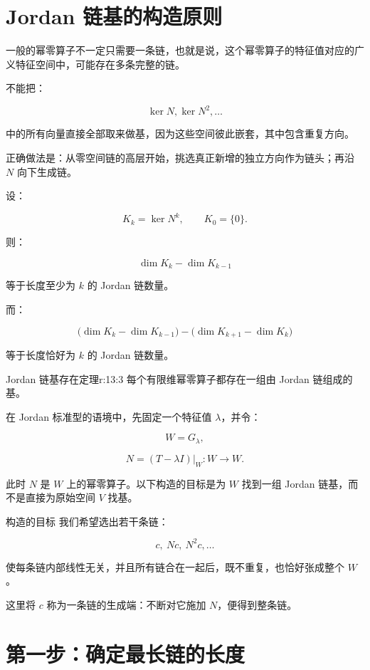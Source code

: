 \section{Jordan 链基的构造原则}

一般的幂零算子不一定只需要一条链，也就是说，这个幂零算子的特征值对应的广义特征空间中，可能存在多条完整的链。

不能把：

\[
\ker N,\ker N^2,\ldots
\]

中的所有向量直接全部取来做基，因为这些空间彼此嵌套，其中包含重复方向。

正确做法是：从零空间链的高层开始，挑选真正新增的独立方向作为链头；再沿 $N$ 向下生成链。

设：

\[
K_k=\ker N^k,
\qquad
K_0=\{0\}.
\]

则：

\[
\dim K_k-\dim K_{k-1}
\]

等于长度至少为 $k$ 的 Jordan 链数量。

而：

\[
\bigl(\dim K_k-\dim K_{k-1}\bigr)
-
\bigl(\dim K_{k+1}-\dim K_k\bigr)
\]

等于长度恰好为 $k$ 的 Jordan 链数量。

\begin{jthm}{Jordan 链基存在定理}{r:13:3}
每个有限维幂零算子都存在一组由 Jordan 链组成的基。

在 Jordan 标准型的语境中，先固定一个特征值 $\lambda$，并令：

\[
W=G_\lambda,
\]

\[
N=(T-\lambda I)|_W:W\to W.
\]

此时 $N$ 是 $W$ 上的幂零算子。以下构造的目标是为 $W$ 找到一组 Jordan 链基，而不是直接为原始空间 $V$ 找基。
\end{jthm}

\begin{jidea}{构造的目标}
我们希望选出若干条链：

\[
c,\ Nc,\ N^2c,\ldots
\]

使每条链内部线性无关，并且所有链合在一起后，既不重复，也恰好张成整个 $W$。

这里将 $c$ 称为一条链的生成端：不断对它施加 $N$，便得到整条链。
\end{jidea}

\section{第一步：确定最长链的长度}

